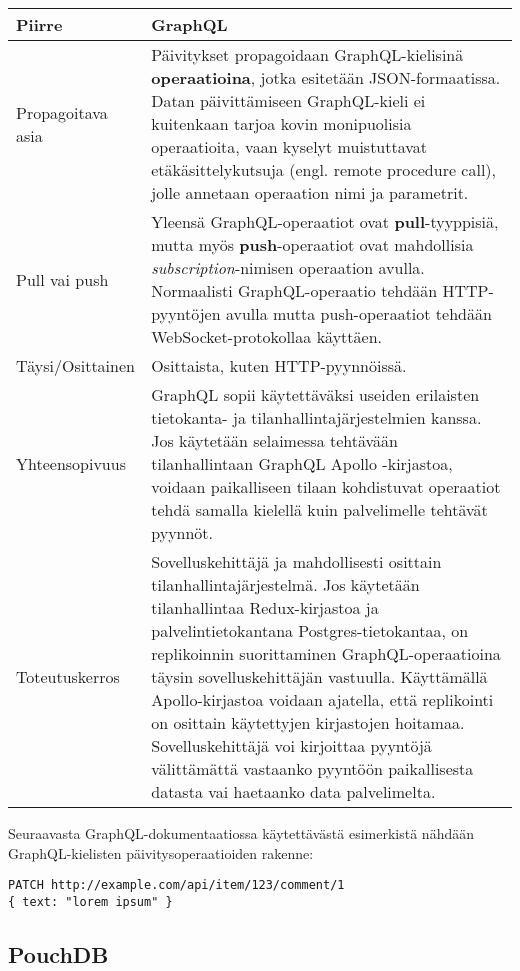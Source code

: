 \documentclass[finnish,twoside,censored,csm,sw-track-2018]{HYthesisML}
\begin{document}
\begin{center}
\begin{tabular}{ | m{3.3cm} | m{11.7cm} | }
 \hline
 \textbf{Piirre} & \textbf{GraphQL}\\ 
 \hline
 Propagoitava asia & Päivitykset propagoidaan GraphQL-kielisinä \textbf{operaatioina}, jotka esitetään JSON-formaatissa. Datan päivittämiseen GraphQL-kieli ei kuitenkaan tarjoa kovin monipuolisia operaatioita, vaan kyselyt muistuttavat etäkäsittelykutsuja (engl. remote procedure call), jolle annetaan operaation nimi ja parametrit. \\
 \hline
 Pull vai push & Yleensä GraphQL-operaatiot ovat \textbf{pull}-tyyppisiä, mutta myös \textbf{push}-operaatiot ovat mahdollisia \textit{subscription}-nimisen operaation avulla. Normaalisti GraphQL-operaatio tehdään HTTP-pyyntöjen avulla mutta push-operaatiot tehdään WebSocket-protokollaa käyttäen. \\
 \hline
 Täysi/Osittainen & Osittaista, kuten HTTP-pyynnöissä.\\
 \hline
 Yhteensopivuus & GraphQL sopii käytettäväksi useiden erilaisten tietokanta- ja tilanhallintajärjestelmien kanssa. Jos käytetään selaimessa tehtävään tilanhallintaan GraphQL Apollo -kirjastoa, voidaan paikalliseen tilaan kohdistuvat operaatiot tehdä samalla kielellä kuin palvelimelle tehtävät pyynnöt. \\
 \hline
 Toteutuskerros & Sovelluskehittäjä ja mahdollisesti osittain tilanhallintajärjestelmä. Jos käytetään tilanhallintaa Redux-kirjastoa ja palvelintietokantana Postgres-tietokantaa, on replikoinnin suorittaminen GraphQL-operaatioina täysin sovelluskehittäjän vastuulla. Käyttämällä Apollo-kirjastoa voidaan ajatella, että replikointi on osittain käytettyjen kirjastojen hoitamaa. Sovelluskehittäjä voi kirjoittaa pyyntöjä välittämättä vastaanko pyyntöön paikallisesta datasta vai haetaanko data palvelimelta. \\
 \hline
\end{tabular}
\label{table-graphql}
\end{center}

Seuraavasta GraphQL-dokumentaatiossa käytettävästä esimerkistä nähdään GraphQL-kielisten päivitysoperaatioiden rakenne:

\begin{Verbatim}[fontsize=\small]
PATCH http://example.com/api/item/123/comment/1
{ text: "lorem ipsum" }
\end{Verbatim}

\subsection{PouchDB}
\end{document}
